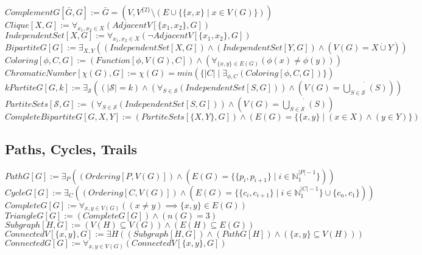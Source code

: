 \documentclass{book}
\newcommand{\abr}{:=}
\newcommand{\pr}[1]{\left(#1\right)}
\newcommand{\st}{\mathbin{|}}
\newcommand{\utup}[1]{\{#1\}}
\begin{document}
$ComplementG[\bar{G}, G] \abr \bar{G} = \pr{V, V^{\{2\}} \setminus \pr{E \cup \{\utup{x, x} \st x \in V(G)\}}}$ \\
$Clique[X, G] \abr \forall_{x_1, x_2 \in X}(AdjacentV[\utup{x_1, x_2}, G])$ \\
$IndependentSet[X, G] \abr \forall_{x_1, x_2 \in X}(\lnot AdjacentV[\utup{x_1, x_2}, G])$ \\
$BipartiteG[G] \abr \exists_{X, Y}\pr{(IndependentSet[X, G]) \land (IndependentSet[Y, G]) \land \pr{V(G) = X \dot{\cup} Y}}$ \\
$Coloring[\phi, C, G] \abr \pr{Function[\phi, V(G), C]} \land \pr{\forall_{\utup{x, y} \in E(G)}\pr{\phi(x) \neq \phi(y)}}$ \\
$ChromaticNumber[\chi(G), G] \abr \chi(G) = min\pr{\{|C| \st \exists_{\phi, C}(Coloring[\phi, C, G])\}}$ \\
$kPartiteG[G, k] \abr \exists_{\mathcal{S}}\pr{(|\mathcal{S}| = k) \land \pr{\forall_{S \in \mathcal{S}}(IndependentSet[S, G])} \land \pr{V(G) = \dot{\bigcup \limits_{S \in \mathcal{S}}^{}}(S)}}$ \\
$PartiteSets[\mathcal{S}, G] \abr \pr{\forall_{S \in \mathcal{S}}(IndependentSet[S, G])} \land \pr{V(G) = \dot{\bigcup \limits_{S \in \mathcal{S}}^{}}(S)}$ \\
$CompleteBipartiteG[G, X, Y] \abr (PartiteSets[\{X, Y\}, G]) \land \pr{E(G) = \{\utup{x, y} \st (x \in X) \land (y \in Y)\}}$ \\


\subsection{Paths, Cycles, Trails}
$PathG[G] \abr \exists_{P}\pr{\pr{Ordering[P, V(G)]} \land \pr{E(G) = \{\utup{p_i, p_{i + 1}} \st i \in \mathbb{N}_1^{|P| - 1}\}}}$ \\
$CycleG[G] \abr \exists_{C}\pr{\pr{Ordering[C, V(G)]} \land \pr{E(G) = \{\utup{c_i, c_{i + 1}} \st i \in \mathbb{N}_1^{|C| - 1}\} \cup \{c_n, c_1\}}}$ \\
$CompleteG[G] \abr \forall_{x, y \in V(G)}\pr{(x \neq y) \implies \utup{x, y} \in E(G)}$ \\
$TriangleG[G] \abr (CompleteG[G]) \land \pr{n(G) = 3}$ \\

$Subgraph[H, G] \abr \pr{V(H) \subseteq V(G)} \land \pr{E(H) \subseteq E(G)}$ \\
$ConnectedV[\{x, y\}, G] \abr \exists{H}\pr{(Subgraph[H, G]) \land (PathG[H]) \land \pr{\{x, y\} \subseteq V(H)}}$ \\
$ConnectedG[G] \abr \forall_{x, y \in V(G)}(ConnectedV[\{x, y\}, G])$ \\
\end{document}
